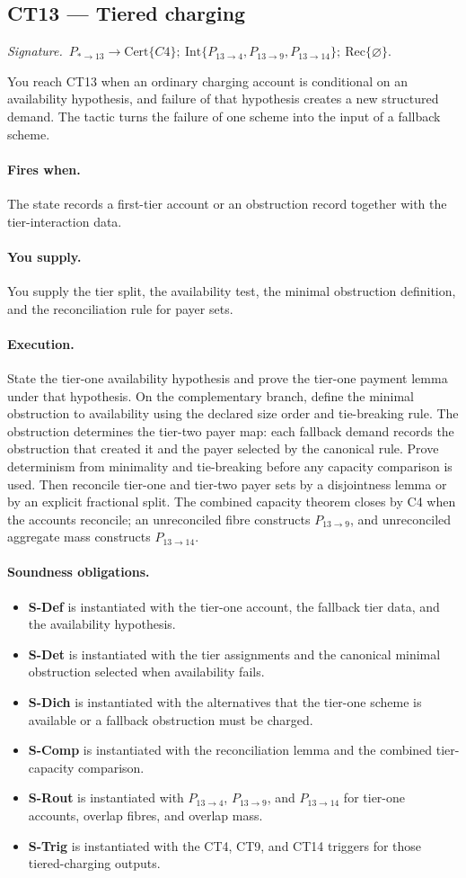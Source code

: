 \documentclass[
  11pt,
]{article}
\providecommand{\tightlist}{%
  \setlength{\itemsep}{0pt}\setlength{\parskip}{0pt}}
\theoremstyle{definition}
\newcommand{\ctsignature}[1]{\par\noindent\emph{Signature.}\ #1\par\medskip}
\newcommand{\ctcert}[1]{\mathrm{Cert}\{#1\}}
\newcommand{\ctint}[1]{\mathrm{Int}\{#1\}}
\newcommand{\ctrec}[1]{\mathrm{Rec}\{#1\}}
\newcommand{\ctnone}{\varnothing}
\newcommand{\ctpar}[1]{\paragraph{#1.}}
\begin{document}
\subsection{CT13 --- Tiered charging}\label{ct:13}\label{tiered-charging-scheme-failure-as-a-demand}
\ctsignature{\(P_{\ast\to13}\to \ctcert{C4};\ \ctint{P_{13\to4},P_{13\to9},P_{13\to14}};\ \ctrec{\ctnone}\).}

You reach CT13 when an ordinary charging account is conditional on an
availability hypothesis, and failure of that hypothesis creates a new
structured demand.  The tactic turns the failure of one scheme into the
input of a fallback scheme.

\ctpar{Fires when}
The state records a first-tier account or an obstruction record together
with the tier-interaction data.

\ctpar{You supply}
You supply the tier split, the availability test, the minimal obstruction
definition, and the reconciliation rule for payer sets.

\ctpar{Execution}
State the tier-one availability hypothesis and prove the tier-one payment
lemma under that hypothesis.  On the complementary branch, define the
minimal obstruction to availability using the declared size order and
tie-breaking rule.  The obstruction determines the tier-two payer map:
each fallback demand records the obstruction that created it and the
payer selected by the canonical rule.  Prove determinism from
minimality and tie-breaking before any capacity comparison is used.  Then
reconcile tier-one and tier-two payer sets by a disjointness lemma or by
an explicit fractional split.  The combined capacity theorem closes by
C4 when the accounts reconcile; an unreconciled fibre constructs
\(P_{13\to9}\), and unreconciled aggregate mass constructs
\(P_{13\to14}\).

\ctpar{Soundness obligations}
\begin{itemize}
\tightlist
\item \textbf{S-Def} is instantiated with the tier-one account, the fallback tier data, and the availability hypothesis.
\item \textbf{S-Det} is instantiated with the tier assignments and the canonical minimal obstruction selected when availability fails.
\item \textbf{S-Dich} is instantiated with the alternatives that the tier-one scheme is available or a fallback obstruction must be charged.
\item \textbf{S-Comp} is instantiated with the reconciliation lemma and the combined tier-capacity comparison.
\item \textbf{S-Rout} is instantiated with \(P_{13\to4}\), \(P_{13\to9}\), and \(P_{13\to14}\) for tier-one accounts, overlap fibres, and overlap mass.
\item \textbf{S-Trig} is instantiated with the CT4, CT9, and CT14 triggers for those tiered-charging outputs.
\end{itemize}
\end{document}
